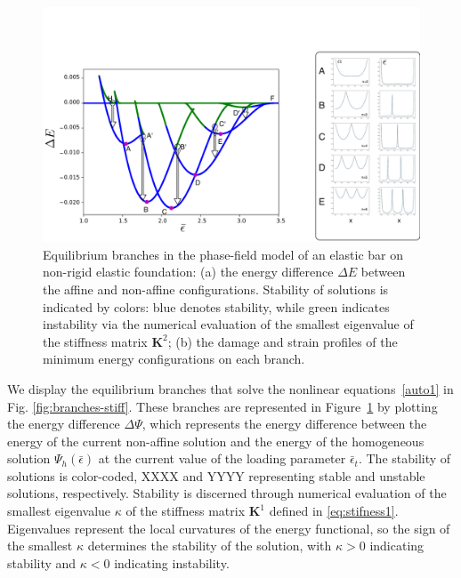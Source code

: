 \begin{figure}
\includegraphics[scale=0.1]{./final_images/fig3.pdf}
    \caption{
Equilibrium branches in the phase-field model of an elastic bar on non-rigid elastic foundation: (a) the energy difference $\Delta E$ between the affine and non-affine configurations. Stability of solutions is indicated by colors: blue denotes stability, while green indicates instability   via the numerical evaluation of the smallest eigenvalue of the stiffness matrix $\mathbf{K}^2$; (b) the damage and strain profiles of the minimum energy configurations on each branch.}
    \label{fig:branches-compliant}
\end{figure}

We display the equilibrium branches that solve the nonlinear equations~\ref{auto1} in Fig. \ref{fig:branches-stiff}. These branches are represented in Figure~\ref{fig:branches-compliant} by plotting the energy difference $\Delta \Psi$, which represents the energy difference between the energy of the current non-affine solution and the energy of the homogeneous solution $\Psi_h(\bar{\epsilon})$ at the current value of the loading parameter $\bar\epsilon_t$. The stability of solutions is color-coded, XXXX and YYYY representing stable and unstable solutions, respectively. Stability is discerned through numerical evaluation of the smallest eigenvalue $\kappa$ of the stiffness matrix $\mathbf{K}^1$ defined in \eqref{eq:stifness1}. Eigenvalues represent the local curvatures of the energy functional, so the sign of the smallest  $\kappa$ determines the stability of the solution, with $\kappa > 0$ indicating stability and $\kappa < 0$ indicating instability.

